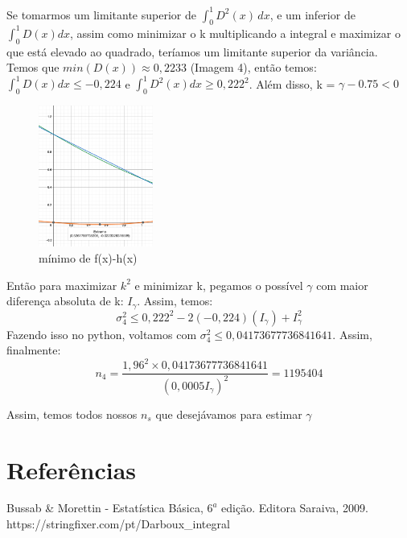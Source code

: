 \documentclass{article}
\begin{document}
Se tomarmos um limitante superior de $\int_{0}^{1}D^2(x) \,dx $, e um inferior de $\int_{0}^{1} D(x)dx$, assim como minimizar o k multiplicando a integral e maximizar o que está elevado ao quadrado, teríamos um limitante superior da variância. Temos que $min(D(x))\approx 0,2233 $ (Imagem 4), então temos:  $\int_{0}^{1} D(x)dx \leq -0,224$ e  $\int_{0}^{1} D^2(x)dx \geq 0,222^2$. Além disso, k = $\gamma -0.75 < 0$ 


\begin{figure}[ht]
\centering
\includegraphics[width=0.335\textwidth]{minimo.png}
\caption{\label{fig:minimo} mínimo de f(x)-h(x) }
\end{figure}


Então para maximizar $k^2$ e minimizar k, pegamos o possível $\gamma$ com maior diferença absoluta de k: $I_\gamma$.
Assim, temos:
\[
\sigma^2_4 \leq 0,222^2 - 2(-0,224)(I_\gamma) + I_\gamma^2
\]
Fazendo isso no python, voltamos com $\sigma^2_4 \leq 0,04173677736841641$. Assim, finalmente:
\[
n_4 =  \frac{1,96^2 \times 0,04173677736841641}{(0,0005 I_\gamma)^2} = 1195404
\]

Assim, temos todos nossos $n_s$ que desejávamos para estimar $\gamma$

\section{Referências}
Bussab \& Morettin - Estatística Básica, $6^a$ edição. Editora Saraiva, 2009.
\\
https://stringfixer.com/pt/Darboux\_integral
\end{document}
